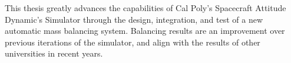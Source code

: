 This thesis greatly advances the capabilities of Cal Poly's 
Spacecraft Attitude Dynamic's Simulator through the design,
integration, and test of a new automatic mass balancing system.
Balancing results are  an improvement over previous iterations 
of the simulator, and align with the results of other universities
in recent years.
